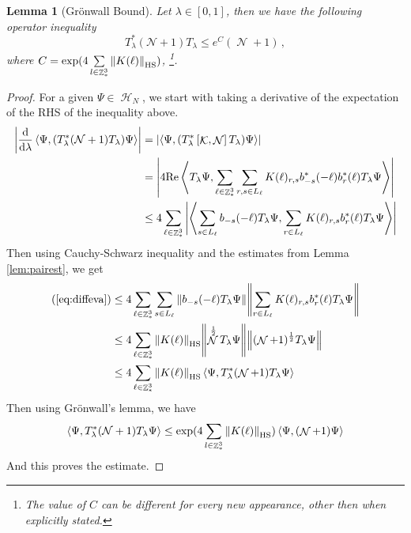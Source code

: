 \documentclass[sn-mathphys, Numbered ,a4paper]{sn-jnl}%
\DeclareMathOperator{\Z}{\mathbb{Z}}
\DeclareMathOperator{\HH}{\mathcal{H}}
\DeclareMathOperator{\KK}{\mathcal{K}}
\DeclareMathOperator{\NN}{\mathcal{N}}
\newcommand{\half}{\frac{1}{2}}
\newcommand{\eva}[1]{\left\langle #1 \right\rangle}
\newcommand{\di}{\mathrm{d}}
\theoremstyle{plain}
\newtheorem{lemma}[theorem]{Lemma}
\theoremstyle{definition}
\theoremstyle{remark}
\theoremstyle{plain}
\theoremstyle{definition}
\theoremstyle{remark}
\begin{document}
\begin{lemma}[Gr\"onwall Bound]\label{lem:gronNest}
    Let $\lambda\in [0,1]$, then we have the following operator inequality
    \begin{equation}
     T^*_{\lambda}(\mathcal{N} +1)T_{\lambda} \leq e^C (\NN+1)\, ,    
    \end{equation}
     where $C = \mathrm{exp}(4\sum\limits_{l\in \Z^3_*}\norm{K(\ell)}_{\mathrm{HS}})$,
     \footnote{The value of $C$ can be different for every new appearance, other then when explicitly stated.}.
\end{lemma}
\begin{proof}
    For a given $\Psi \in \HH_N$, we start with taking a derivative of the expectation of the RHS of the inequality above.
    \begin{align}
        \left|\frac{\di}{\di\lambda}\eva{\Psi, (T^*_{\lambda}(\mathcal{N} +1)T_{\lambda})\Psi }\right| 
        &= \left|\eva{\Psi,(T^*_{\lambda}\left[\KK,\NN\right]T_{\lambda}) \Psi}\right|\nonumber\\
        &= \abs{4\mathrm{Re} \eva{T_\lambda\Psi,\sum\limits_{\ell \in \Z^3_*}\sum\limits_{r,s \in L_{\ell}}K(\ell)_{r,s} b^*_{-s}(-\ell)b^*_{r}(\ell)T_\lambda\Psi}}\nonumber\\
        &\leq 4 \sum\limits_{\ell \in \Z^3_*} \abs{\eva{\sum\limits_{s \in L_{\ell}}b_{-s}(-\ell) T_\lambda\Psi,\sum\limits_{r \in L_{\ell}}K(\ell)_{r,s} b^*_{r}(\ell)T_\lambda\Psi}}\label{eq:diffeva}
    \end{align}
    Then using Cauchy-Schwarz inequality and the estimates from Lemma \ref{lem:pairest}, we get
    \begin{align}
        (\ref{eq:diffeva}) &\leq 4\sum\limits_{\ell \in \Z^3_*}\sum\limits_{s \in L_{\ell}} \norm{b_{-s}(-\ell) T_\lambda\Psi} \norm{\sum\limits_{r \in L_{\ell}}K(\ell)_{r,s} b^*_{r}(\ell)T_\lambda\Psi} \nonumber\\
        &\leq 4 \sum\limits_{\ell \in \Z^3_*} \norm{K(\ell)}_{\mathrm{HS}}\norm{\NN^\half T_\lambda\Psi}\norm{(\NN+1)^\half T_\lambda\Psi}\nonumber\\
        &\leq 4 \sum\limits_{\ell \in \Z^3_*} \norm{K(\ell)}_{\mathrm{HS}} \eva{\Psi,T^*_\lambda(\NN+1)T_\lambda\Psi}
    \end{align}
    Then using Gr\"onwall's lemma, we have
    \begin{equation}
        \eva{\Psi, T^*_{\lambda}(\mathcal{N} +1)T_{\lambda} \Psi } \leq \mathrm{exp}(4\sum\limits_{l\in \Z^3_*} \norm{K(\ell)}_{\mathrm{HS}}) \eva{\Psi, (\NN+1)\Psi}
    \end{equation}
    And this proves the estimate.
\end{proof}
\end{document}
